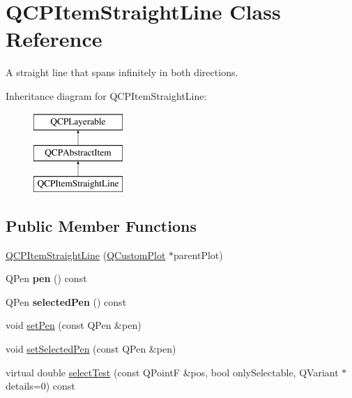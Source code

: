 \hypertarget{classQCPItemStraightLine}{\section{\-Q\-C\-P\-Item\-Straight\-Line \-Class \-Reference}
\label{classQCPItemStraightLine}
}


\-A straight line that spans infinitely in both directions.  


\-Inheritance diagram for \-Q\-C\-P\-Item\-Straight\-Line\-:\begin{figure}[H]
\begin{center}
\leavevmode
\includegraphics[height=3.000000cm]{classQCPItemStraightLine}
\end{center}
\end{figure}
\subsection*{\-Public \-Member \-Functions}
\begin{DoxyCompactItemize}
\item 
\hyperlink{classQCPItemStraightLine_a41fd2e1f006983449eca9830930c3b10}{\-Q\-C\-P\-Item\-Straight\-Line} (\hyperlink{classQCustomPlot}{\-Q\-Custom\-Plot} $\ast$parent\-Plot)
\item 
\hypertarget{classQCPItemStraightLine_ad858ab1a444391aab778f765453ea222}{\-Q\-Pen {\bfseries pen} () const }\label{classQCPItemStraightLine_ad858ab1a444391aab778f765453ea222}

\item 
\hypertarget{classQCPItemStraightLine_a9e33ae966a7e2ea1083b3b9aeabeaea5}{\-Q\-Pen {\bfseries selected\-Pen} () const }\label{classQCPItemStraightLine_a9e33ae966a7e2ea1083b3b9aeabeaea5}

\item 
void \hyperlink{classQCPItemStraightLine_a9f36c9c9e60d7d9ac084c80380ac8601}{set\-Pen} (const \-Q\-Pen \&pen)
\item 
void \hyperlink{classQCPItemStraightLine_a5c33559498d33543fa95cf0a36e851ff}{set\-Selected\-Pen} (const \-Q\-Pen \&pen)
\item 
virtual double \hyperlink{classQCPItemStraightLine_a64cc3796f58ce856012732603edb2f1c}{select\-Test} (const \-Q\-Point\-F \&pos, bool only\-Selectable, \-Q\-Variant $\ast$details=0) const 
\end{DoxyCompactItemize}

